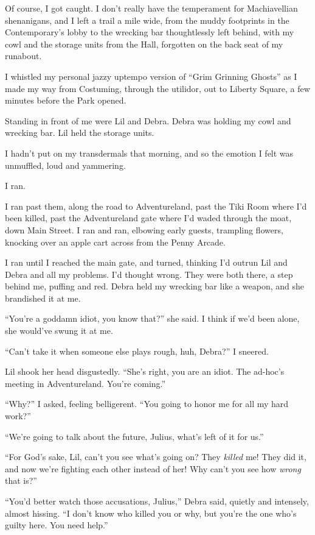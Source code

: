 Of course, I got caught. I don't really have the temperament for
Machiavellian shenanigans, and I left a trail a mile wide, from the
muddy footprints in the Contemporary's lobby to the wrecking bar
thoughtlessly left behind, with my cowl and the storage units from
the Hall, forgotten on the back seat of my runabout.

I whistled my personal jazzy uptempo version of “Grim Grinning
Ghosts” as I made my way from Costuming, through the utilidor, out
to Liberty Square, a few minutes before the Park opened.

Standing in front of me were Lil and Debra. Debra was holding my
cowl and wrecking bar. Lil held the storage units.

I hadn't put on my transdermals that morning, and so the emotion I
felt was unmuffled, loud and yammering.

I ran.

I ran past them, along the road to Adventureland, past the Tiki
Room where I'd been killed, past the Adventureland gate where I'd
waded through the moat, down Main Street. I ran and ran, elbowing
early guests, trampling flowers, knocking over an apple cart across
from the Penny Arcade.

I ran until I reached the main gate, and turned, thinking I'd
outrun Lil and Debra and all my problems. I'd thought wrong. They
were both there, a step behind me, puffing and red. Debra held my
wrecking bar like a weapon, and she brandished it at me.

“You're a goddamn idiot, you know that?” she said. I think if we'd
been alone, she would've swung it at me.

“Can't take it when someone else plays rough, huh, Debra?” I
sneered.

Lil shook her head disgustedly. “She's right, you are an idiot. The
ad-hoc's meeting in Adventureland. You're coming.”

“Why?” I asked, feeling belligerent. “You going to honor me for all
my hard work?”

“We're going to talk about the future, Julius, what's left of it
for us.”

“For God's sake, Lil, can't you see what's going on? They
\emph{killed} me! They did it, and now we're fighting each other
instead of her! Why can't you see how \emph{wrong} that is?”

“You'd better watch those accusations, Julius,” Debra said, quietly
and intensely, almost hissing. “I don't know who killed you or why,
but you're the one who's guilty here. You need help.”

